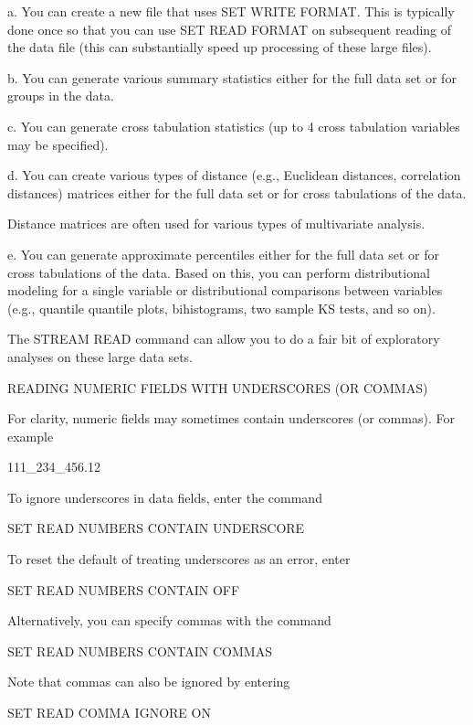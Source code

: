       a. You can create a new file that uses SET WRITE FORMAT.  This
         is typically done once so that you can use SET READ FORMAT on
         subsequent reading of the data file (this can substantially
         speed up processing of these large files).

      b. You can generate various summary statistics either for the full
         data set or for groups in the data.

      c. You can generate cross tabulation statistics (up to 4
         cross tabulation variables may be specified).

      d. You can create various types of distance (e.g., Euclidean
         distances, correlation distances) matrices either for the full
         data set or for cross tabulations of the data.
 
         Distance matrices are often used for various types of
         multivariate analysis.

      e. You can generate approximate percentiles either for the full
         data set or for cross tabulations of the data.  Based on this,
         you can perform distributional modeling for a single variable
         or distributional comparisons between variables (e.g.,
         quantile quantile plots, bihistograms, two sample KS tests, and
         so on).

      The STREAM READ command can allow you to do a fair bit of
      exploratory analyses on these large data sets.  

READING NUMERIC FIELDS WITH UNDERSCORES (OR COMMAS)

For clarity, numeric fields may sometimes contain underscores (or
commas).  For example

   111_234_456.12

To ignore underscores in data fields, enter the command

   SET READ NUMBERS CONTAIN UNDERSCORE

To reset the default of treating underscores as an error, enter

   SET READ NUMBERS CONTAIN OFF

Alternatively, you can specify commas with the command

   SET READ NUMBERS CONTAIN COMMAS

Note that commas can also be ignored by entering

   SET READ COMMA IGNORE ON

